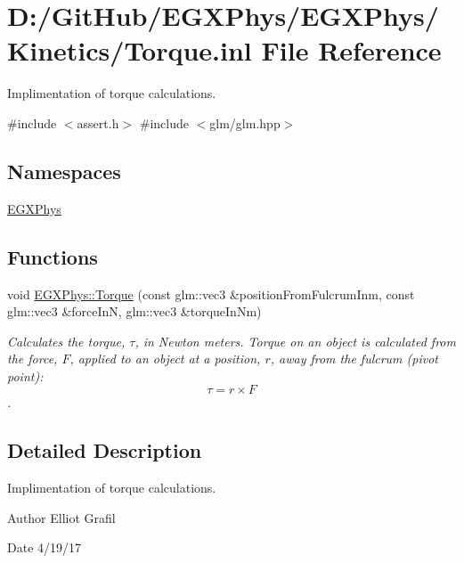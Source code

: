 \hypertarget{_torque_8inl}{}\section{D\+:/\+Git\+Hub/\+E\+G\+X\+Phys/\+E\+G\+X\+Phys/\+Kinetics/\+Torque.inl File Reference}
\label{_torque_8inl}


Implimentation of torque calculations.  


{\ttfamily \#include $<$assert.\+h$>$}\newline
{\ttfamily \#include $<$glm/glm.\+hpp$>$}\newline
\subsection*{Namespaces}
\begin{DoxyCompactItemize}
\item 
 \mbox{\hyperlink{namespace_e_g_x_phys}{E\+G\+X\+Phys}}
\end{DoxyCompactItemize}
\subsection*{Functions}
\begin{DoxyCompactItemize}
\item 
void \mbox{\hyperlink{group___e_g_x_phys-_kinetics-_torque_ga12a787853cab88d40412c8290ca41c61}{E\+G\+X\+Phys\+::\+Torque}} (const glm\+::vec3 \&position\+From\+Fulcrum\+Inm, const glm\+::vec3 \&force\+InN, glm\+::vec3 \&torque\+In\+Nm)
\begin{DoxyCompactList}\small\item\em Calculates the torque, $\tau$, in Newton meters. Torque on an object is calculated from the force, $F$, applied to an object at a position, $r$, away from the fulcrum (pivot point)\+: \[\tau=r \times F \]. \end{DoxyCompactList}\end{DoxyCompactItemize}


\subsection{Detailed Description}
Implimentation of torque calculations. 

\begin{DoxyAuthor}{Author}
Elliot Grafil 
\end{DoxyAuthor}
\begin{DoxyDate}{Date}
4/19/17 
\end{DoxyDate}
